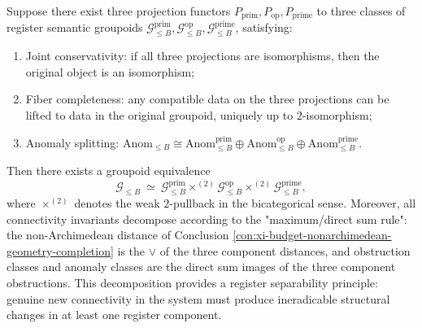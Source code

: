 \begin{conclusion}\label{con:xi-three-projection-2pullback-register-separability}
Suppose there exist three projection functors
\(
P_{\mathrm{prim}},P_{\mathrm{op}},P_{\mathrm{prime}}
\)
to three classes of register semantic groupoids
\(
\mathcal{G}_{\le B}^{\mathrm{prim}},\mathcal{G}_{\le B}^{\mathrm{op}},\mathcal{G}_{\le B}^{\mathrm{prime}}
\),
satisfying:
\begin{enumerate}
  \item Joint conservativity: if all three projections are isomorphisms, then the original object is an isomorphism;
  \item Fiber completeness: any compatible data on the three projections can be lifted to data in the original groupoid, uniquely up to \(2\)-isomorphism;
  \item Anomaly splitting: \(\mathrm{Anom}_{\le B}\cong \mathrm{Anom}_{\le B}^{\mathrm{prim}}\oplus \mathrm{Anom}_{\le B}^{\mathrm{op}}\oplus \mathrm{Anom}_{\le B}^{\mathrm{prime}}\).
\end{enumerate}
Then there exists a groupoid equivalence
\[
\mathcal{G}_{\le B}\ \simeq\
\mathcal{G}_{\le B}^{\mathrm{prim}}\times^{(2)}\mathcal{G}_{\le B}^{\mathrm{op}}\times^{(2)}\mathcal{G}_{\le B}^{\mathrm{prime}},
\]
where \(\times^{(2)}\) denotes the weak \(2\)-pullback in the bicategorical sense.
Moreover, all connectivity invariants decompose according to the "maximum/direct sum rule": the non-Archimedean distance of Conclusion \ref{con:xi-budget-nonarchimedean-geometry-completion} is the \(\vee\) of the three component distances, and obstruction classes and anomaly classes are the direct sum images of the three component obstructions.
This decomposition provides a register separability principle: genuine new connectivity in the system must produce ineradicable structural changes in at least one register component.
\end{conclusion}

